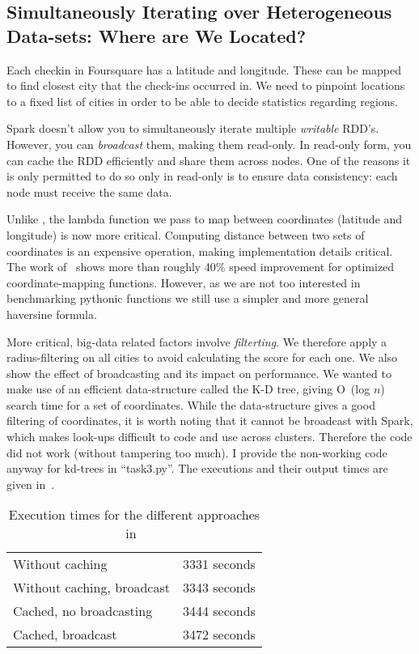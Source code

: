 

\subsection{Simultaneously Iterating over Heterogeneous Data-sets: Where are We Located?}\label{sec:where}
Each checkin in Foursquare has a latitude and longitude. These can be mapped to find closest
city that the check-ins occurred in.  We need to pinpoint locations to a fixed list of cities 
in order to be able to decide statistics regarding regions. 

Spark doesn't allow you to simultaneously iterate multiple \textit{writable} RDD's. However, you can \textit{broadcast} them, making them read-only. In read-only form, you can cache the RDD efficiently and share them across nodes. One of the reasons it is only permitted to do so only  in read-only is to ensure data consistency: each node must receive the same data. 

Unlike , the lambda function we pass to map between coordinates (latitude and longitude) is now more critical. Computing distance between two sets of coordinates is an expensive operation, making implementation details critical. The work of~\cite{mackey2010efficient} shows more than roughly 40\% speed improvement for optimized coordinate-mapping functions. However, as we are not too interested in benchmarking pythonic functions we still use a simpler and more general haversine formula.

More critical, big-data related factors involve \textit{filterting}. We therefore apply a radius-filtering on all cities to avoid calculating the score for each one. We also show the effect of broadcasting and its impact on performance.
We wanted to make use of an efficient data-structure called the K-D tree, giving O~(log $n$) search time for a set of coordinates. While the data-structure gives a good filtering of coordinates, it is worth noting that it cannot be broadcast with Spark, which makes look-ups difficult to code and use across clusters. Therefore the code did not work (without tampering too much). I provide the non-working code anyway for kd-trees  in ``task3.py''. The executions and their output times are given in~.

\begin{table}
\centering
\begin{tabular}{p{}|p{}}
        Without caching & 3331 seconds\\
        Without caching, broadcast  & 3343 seconds \\
        Cached, no broadcasting & 3444 seconds \\
        Cached, broadcast  & 3472  seconds \\
    \end{tabular}
    \caption{Execution times for the different approaches in~}
\label{tab:task3out}
\end{table}

